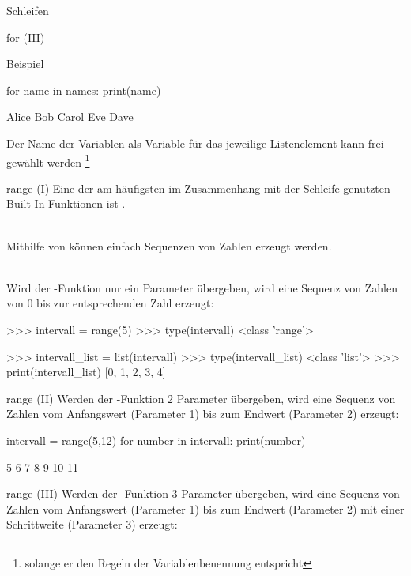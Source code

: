 \begin{subsection}{Schleifen}
\begin{frame}[fragile]{for (III)}
\begin{exampleblock}{Beispiel}
\begin{pythoncode}
for name in names:
    print(name)

Alice
Bob
Carol
Eve
Dave
\end{pythoncode}

            Der Name der Variablen  als Variable für das jeweilige Listenelement kann frei gewählt werden \footnote{solange er den Regeln der Variablenbenennung entspricht}
            
            \end{exampleblock}
        \end{frame}
        
        \begin{frame}[fragile]{range (I)}
            Eine der am häufigsten im Zusammenhang mit der  Schleife genutzten Built-In Funktionen ist . \\~\
            
            Mithilfe von  können einfach Sequenzen von Zahlen erzeugt werden. \\~\
            
            Wird der -Funktion nur ein Parameter übergeben, wird eine Sequenz von Zahlen von 0 bis zur entsprechenden Zahl erzeugt:
            
\begin{pyconcode}
>>> intervall = range(5)
>>> type(intervall)
<class 'range'>

>>> intervall_list = list(intervall)
>>> type(intervall_list)
<class 'list'>
>>> print(intervall_list)
[0, 1, 2, 3, 4]
\end{pyconcode}

        \end{frame}
        
        \begin{frame}[fragile]{range (II)}
             Werden der -Funktion 2 Parameter übergeben, wird eine Sequenz von Zahlen vom Anfangswert (Parameter 1) bis zum Endwert (Parameter 2) erzeugt:

\begin{pythoncode}
intervall = range(5,12)
for number in intervall:
    print(number)

5
6
7
8
9
10
11
\end{pythoncode}             
        \end{frame}
        
        \begin{frame}[fragile]{range (III)}
             Werden der -Funktion 3 Parameter übergeben, wird eine Sequenz von Zahlen vom Anfangswert (Parameter 1) bis zum Endwert (Parameter 2) mit einer Schrittweite (Parameter 3) erzeugt:


\end{frame}
\end{subsection}
